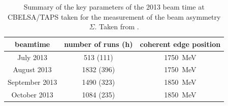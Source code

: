 \begin{table}[htbp]
	\centering
	\begin{tabular}{ccc}
		\toprule
\textbf{beamtime} & \textbf{number of runs (h)} & \textbf{coherent edge position}\\
\hline
July 2013 & 513 (111) & \SI{1750}{\mega\eV}\\	
August 2013 & 1832 (396) & \SI{1750}{\mega\eV}\\		
September 2013 & 1490 (323) & \SI{1850}{\mega\eV}\\		
October 2013 & 1084 (235) & \SI{1850}{\mega\eV}\\			
\bottomrule
\end{tabular}
\caption{Summary of the key parameters of the 2013 beam time at CBELSA/TAPS taken for the measurement of the beam asymmetry $\Sigma$. Taken from \cite{farahphd}.}
\label{tab:sumbeam}
\end{table}



